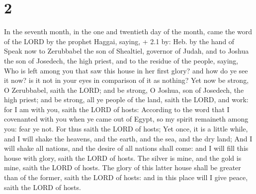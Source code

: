 \hypertarget{section-1}{%
\section{2}\label{section-1}}

 In the seventh month, in the one and twentieth day of the
month, came the word of the LORD by the prophet Haggai, saying, + 2.1
by: Heb. by the hand of  Speak now to Zerubbabel the son of
Shealtiel, governor of Judah, and to Joshua the son of Josedech, the
high priest, and to the residue of the people, saying,  Who
is left among you that saw this house in her first glory? and how do ye
see it now? is it not in your eyes in comparison of it as nothing?
 Yet now be strong, O Zerubbabel, saith the LORD; and be
strong, O Joshua, son of Josedech, the high priest; and be strong, all
ye people of the land, saith the LORD, and work: for I am with you,
saith the LORD of hosts:  According to the word that I
covenanted with you when ye came out of Egypt, so my spirit remaineth
among you: fear ye not.  For thus saith the LORD of hosts;
Yet once, it is a little while, and I will shake the heavens, and the
earth, and the sea, and the dry land;  And I will shake all
nations, and the desire of all nations shall come: and I will fill this
house with glory, saith the LORD of hosts.  The silver is
mine, and the gold is mine, saith the LORD of hosts.  The
glory of this latter house shall be greater than of the former, saith
the LORD of hosts: and in this place will I give peace, saith the LORD
of hosts.

